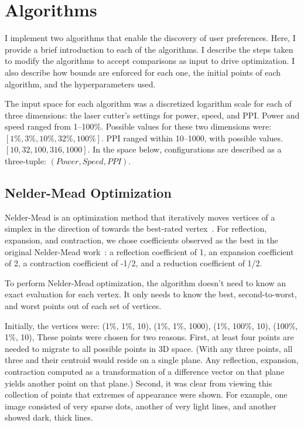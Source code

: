 \section{Algorithms}

I implement two algorithms that enable the discovery of user preferences.
Here, I provide a brief introduction to each of the algorithms.
I describe the steps taken to modify the algorithms to accept comparisons as input to drive optimization.
I also describe how bounds are enforced for each one, the initial points of each algorithm, and the hyperparameters used.

The input space for each algorithm was a discretized logarithm scale for each of three dimensions: the laser cutter's settings for power, speed, and PPI\@.
Power and speed ranged from 1--100\%.
Possible values for these two dimensions were:
$\left[1\%, 3\%, 10\%, 32\%, 100\%\right]$.
PPI ranged within 10--1000, with possible values.
$\left[10, 32, 100, 316, 1000\right]$.
In the space below, configurations are described as a three-tuple:
$\left(Power, Speed, PPI\right)$.

\subsection{Nelder-Mead Optimization}

Nelder-Mead is an optimization method that iteratively moves vertices of a simplex in the direction of towards the best-rated vertex~\cite{nelder_simplex_1965}.
For reflection, expansion, and contraction, we chose coefficients observed as the best in the original Nelder-Mead work~\cite{nelder_simplex_1965}:
a reflection coefficient of 1,
an expansion coefficient of 2,
a contraction coefficient of -1/2,
and a reduction coefficient of 1/2.

To perform Nelder-Mead optimization, the algorithm doesn't need to know an exact evaluation for each vertex.
It only needs to know the best, second-to-worst, and worst points out of each set of vertices.

Initially, the vertices were:
(1\%, 1\%, 10),
(1\%, 1\%, 1000),
(1\%, 100\%, 10),
(100\%, 1\%, 10),
These points were chosen for two reasons.
First, at least four points are needed to migrate to all possible points in 3D space.
(With any three points, all three and their centroid would reside on a single plane.
Any reflection, expansion, contraction computed as a transformation of a difference vector on that plane yields another point on that plane.)
Second, it was clear from viewing this collection of points that extremes of appearance were shown.
For example, one image consisted of very sparse dots, another of very light lines, and another showed dark, thick lines.

